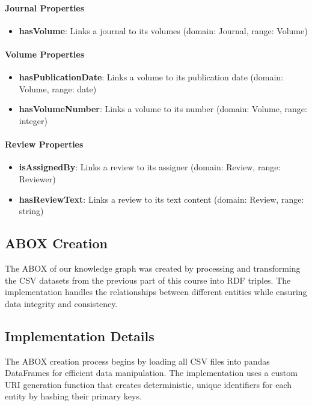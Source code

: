 \documentclass[10pt,a4paper]{article}
\begin{document}
\paragraph{Journal Properties}
\begin{itemize}
    \item \textbf{hasVolume}: Links a journal to its volumes (domain: Journal, range: Volume)
\end{itemize}

\paragraph{Volume Properties}
\begin{itemize}
    \item \textbf{hasPublicationDate}: Links a volume to its publication date (domain: Volume, range: date)
    \item \textbf{hasVolumeNumber}: Links a volume to its number (domain: Volume, range: integer)
\end{itemize}

\paragraph{Review Properties}
\begin{itemize}
    \item \textbf{isAssignedBy}: Links a review to its assigner (domain: Review, range: Reviewer)
    \item \textbf{hasReviewText}: Links a review to its text content (domain: Review, range: string)
\end{itemize}

\subsection{ABOX Creation}
\label{sec:abox}

The ABOX of our knowledge graph was created by processing and transforming the CSV datasets from the previous part of this course into RDF triples. The implementation handles the relationships between different entities while ensuring data integrity and consistency.

\subsection{Implementation Details}

The ABOX creation process begins by loading all CSV files into pandas DataFrames for efficient data manipulation. The implementation uses a custom URI generation function that creates deterministic, unique identifiers for each entity by hashing their primary keys.
\end{document}
